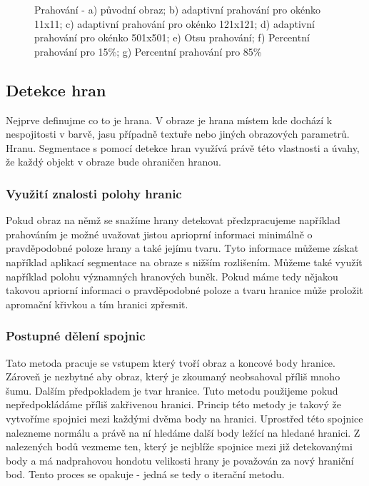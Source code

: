 \documentclass{thesis}%
\begin{document}
\begin{figure}[htp!]
	\caption[Prahování]{Prahování - a) původní obraz; b) adaptivní prahování pro okénko 11x11; c) adaptivní prahování pro okénko 121x121; d) adaptivní prahování pro okénko 501x501; e) Otsu prahování; f) Percentní prahování pro 15\%; g) Percentní prahování pro 85\%}
\end{figure}
\subsection{Detekce hran}
Nejprve definujme co to je hrana. V obraze je hrana místem kde dochází k nespojitosti v barvě, jasu případně textuře nebo jiných obrazových parametrů. Hranu. Segmentace s pomocí detekce hran využívá právě této vlastnosti a úvahy, že každý objekt v obraze bude ohraničen hranou.
\subsubsection{Využití znalosti polohy hranic}
Pokud obraz na němž se snažíme hrany detekovat předzpracujeme například prahováním je možné uvažovat jistou aprioprní informaci minimálně o pravděpodobné poloze hrany a také jejímu tvaru. Tyto informace můžeme získat například aplikací segmentace na obraze s nižším rozlišením. Můžeme také využít například polohu významných hranových buněk. Pokud máme tedy nějakou takovou apriorní informaci o pravděpodobné poloze a tvaru hranice může proložit apromační křivkou a tím hranici zpřesnit.
\subsubsection{Postupné dělení spojnic}
Tato metoda pracuje se vstupem který tvoří obraz a koncové body hranice. Zároveň je nezbytné aby obraz, který je zkoumaný neobsahoval příliš mnoho šumu. Dalším předpokladem je tvar hranice. Tuto metodu použijeme pokud nepředpokládáme příliš zakřivenou hranici. Princip této metody je takový že vytvoříme spojnici mezi každými dvěma body na hranici. Uprostřed této spojnice nalezneme normálu a právě na ní hledáme další body ležící na hledané hranici. Z nalezených bodů vezmeme ten, který je nejblíže spojnice mezi již detekovanými body a má nadprahovou hondotu velikosti hrany je považován za nový hraniční bod. Tento proces se opakuje - jedná se tedy o iterační metodu.
\end{document}
